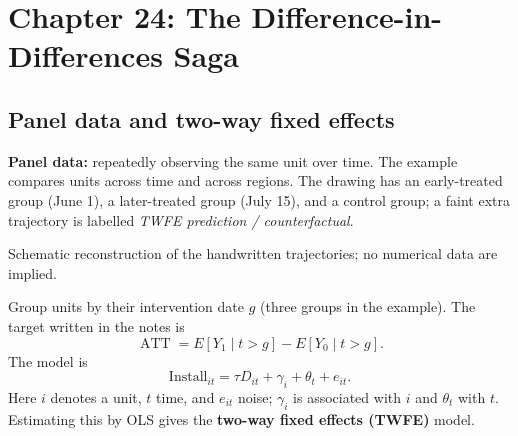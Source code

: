 \section{Chapter 24: The Difference-in-Differences Saga}
\subsection{Panel data and two-way fixed effects}
\textbf{Panel data:} repeatedly observing the same unit over time. The example compares units across time and across regions. The drawing has an early-treated group (June 1), a later-treated group (July 15), and a control group; a faint extra trajectory is labelled \emph{TWFE prediction / counterfactual}.
\begin{center}

{\small Schematic reconstruction of the handwritten trajectories; no numerical data are implied.}
\end{center}
Group units by their intervention date \(g\) (three groups in the example). The target written in the notes is
\[
\operatorname{ATT}=E[Y_1\mid t>g]-E[Y_0\mid t>g].
\]
The model is
\[
\mathrm{Install}_{it}=\tau D_{it}+\gamma_i+\theta_t+e_{it}.
\]
Here \(i\) denotes a unit, \(t\) time, and \(e_{it}\) noise; \(\gamma_i\) is associated with \(i\) and \(\theta_t\) with \(t\). Estimating this by OLS gives the \textbf{two-way fixed effects (TWFE)} model.

